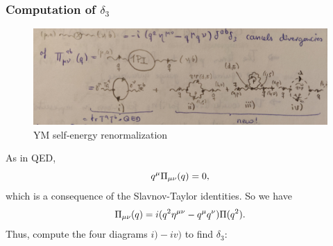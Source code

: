 \subsubsection{Computation of $\delta_3$}
\begin{figure}[h!]
	\centering
	\includegraphics[width=0.5\linewidth]{gfx/YMpictures/YMselfenergy}
	\caption{YM self-energy renormalization}
	\label{fig:ymselfenergy}
\end{figure}
As in QED, \begin{equation}
	q^\mu \Pi_{\mu \nu}(q)=0,
\end{equation}
which is a consequence of the Slavnov-Taylor identities. So we have
\begin{equation*}
	\Pi_{\mu \nu}(q)=i (q^2 \eta^{\mu \nu} - q^\mu q^\nu) \Pi(q^2).
\end{equation*}
Thus, compute the four diagrams $i)-iv)$ to find $\delta_3$:
